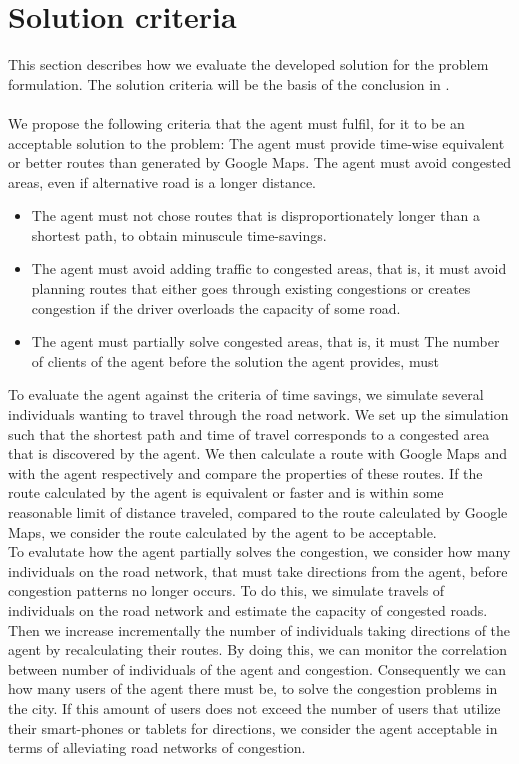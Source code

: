 \section{Solution criteria}
This section describes how we evaluate the developed solution for the problem formulation. The solution criteria will be the basis of the conclusion in . 
\\\\
We propose the following criteria that the agent must fulfil, for it to be an acceptable solution to the problem:
The agent must provide time-wise equivalent or better routes than generated by Google Maps.
The agent must avoid congested areas, even if alternative road is a longer distance.
\begin{itemize}
\item The agent must not chose routes that is disproportionately longer than a shortest path, to obtain minuscule time-savings. 

\item The agent must avoid adding traffic to congested areas, that is, it must avoid planning routes that either goes through existing congestions or creates congestion if the driver overloads the capacity of some road. 

\item The agent must partially solve congested areas, that is, it must The number of clients of the agent before the solution the agent provides, must
\end{itemize}
To evaluate the agent against the criteria of time savings, we simulate several individuals wanting to travel through the road network. We set up the simulation such that the shortest path and time of travel corresponds to a congested area that is discovered by the agent. We then calculate a route with Google Maps and with the agent respectively and compare the properties of these routes. If the route calculated by the agent is equivalent or faster and is within some reasonable limit of distance traveled, compared to the route calculated by Google Maps, we consider the route calculated by the agent to be acceptable.\\
To evalutate how the agent partially solves the congestion, we consider how many individuals on the road network, that must take directions from the agent, before congestion patterns no longer occurs. To do this, we simulate travels of individuals on the road network and estimate the capacity  of congested roads. Then we increase incrementally the number of individuals taking directions of the agent by recalculating their routes. By doing this, we can monitor the correlation between number of individuals of the agent and congestion. Consequently we can how many users of the agent there must be, to solve the congestion problems in the city. If this amount of users does not exceed the number of users that utilize their smart-phones or tablets for directions, we consider the agent acceptable in terms of alleviating road networks of congestion.
